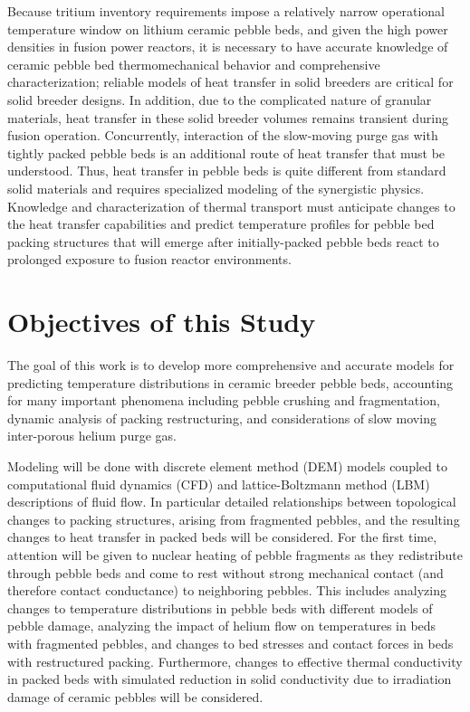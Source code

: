 Because tritium inventory requirements impose a relatively narrow operational temperature window on lithium ceramic pebble beds, and given the high power densities in fusion power reactors, it is necessary to have accurate knowledge of ceramic pebble bed thermomechanical behavior and comprehensive characterization; reliable models of heat transfer in solid breeders are critical for solid breeder designs. In addition, due to the complicated nature of granular materials, heat transfer in these solid breeder volumes remains transient during fusion operation. Concurrently, interaction of the slow-moving purge gas with tightly packed pebble beds is an additional route of heat transfer that must be understood. Thus, heat transfer in pebble beds is quite different from standard solid materials and requires specialized modeling of the synergistic physics. Knowledge and characterization of thermal transport must anticipate changes to the heat transfer capabilities and predict temperature profiles for pebble bed packing structures that will emerge after initially-packed pebble beds react to prolonged exposure to fusion reactor environments.


\section{Objectives of this Study}\label{sec:intro-scope-of-work}
The goal of this work is to develop more comprehensive and accurate models for predicting temperature distributions in ceramic breeder pebble beds, accounting for many important phenomena including pebble crushing and fragmentation, dynamic analysis of packing restructuring, and considerations of slow moving inter-porous helium purge gas. 

Modeling will be done with discrete element method (DEM) models coupled to computational fluid dynamics (CFD) and lattice-Boltzmann method (LBM) descriptions of fluid flow. In particular detailed relationships between topological changes to packing structures, arising from fragmented pebbles, and the resulting changes to heat transfer in packed beds will be considered. For the first time, attention will be given to nuclear heating of pebble fragments as they redistribute through pebble beds and come to rest without strong mechanical contact (and therefore contact conductance) to neighboring pebbles. This includes analyzing changes to temperature distributions in pebble beds with different models of pebble damage, analyzing the impact of helium flow on temperatures in beds with fragmented pebbles, and changes to bed stresses and contact forces in beds with restructured packing. Furthermore, changes to effective thermal conductivity in packed beds with simulated reduction in solid conductivity due to irradiation damage of ceramic pebbles will be considered. 

